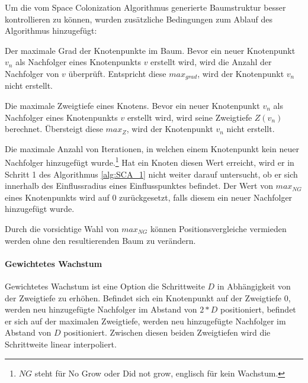 Um die vom Space Colonization Algorithmus generierte Baumstruktur besser kontrollieren zu können, wurden zusätzliche Bedingungen zum Ablauf des Algorithmus hinzugefügt:
\begin{description}[labelindent]
	\item[\boldmath$max_{grad}$] Der maximale Grad der Knotenpunkte im Baum. Bevor ein neuer Knotenpunkt $v_n$ als Nachfolger eines Knotenpunkts $v$ erstellt wird, wird die Anzahl der Nachfolger von $v$ überprüft. Entspricht diese $max_{grad}$, wird der Knotenpunkt $v_n$ nicht erstellt.\\
	
	\item[\boldmath$max_{Z}$] Die maximale Zweigtiefe eines Knotens. Bevor ein neuer Knotenpunkt $v_n$ als Nachfolger eines Knotenpunkts $v$ erstellt wird, wird seine Zweigtiefe $Z(v_n)$ berechnet. Übersteigt diese $max_{Z}$, wird der Knotenpunkt $v_n$ nicht erstellt.\\
	
	\item[\boldmath$max_{NG}$] Die maximale Anzahl von Iterationen, in welchen einem Knotenpunkt kein neuer Nachfolger hinzugefügt wurde.\footnote{$NG$ steht für \glqq No Grow\grqq{} oder \glqq Did not grow\grqq, englisch für \glqq kein Wachstum\grqq.} Hat ein Knoten diesen Wert erreicht, wird er in Schritt 1 des Algorithmus \ref{alg:SCA_1} nicht weiter darauf untersucht, ob er sich innerhalb des Einflussradius eines Einflusspunktes befindet. Der Wert von $max_{NG}$ eines Knotenpunkts wird auf $0$ zurückgesetzt, falls diesem ein neuer Nachfolger hinzugefügt wurde.
	
	Durch die vorsichtige Wahl von $max_{NG}$ können Positionsvergleiche vermieden werden ohne den resultierenden Baum zu verändern.
\end{description}

\paragraph{Gewichtetes Wachstum}

Gewichtetes Wachstum ist eine Option die Schrittweite $D$ in Abhängigkeit von der Zweigtiefe zu erhöhen. Befindet sich ein Knotenpunkt auf der Zweigtiefe $0$, werden neu hinzugefügte Nachfolger im Abstand von $2 * D$ positioniert, befindet er sich auf der maximalen Zweigtiefe, werden neu hinzugefügte Nachfolger im Abstand von $D$ positioniert. Zwischen diesen beiden Zweigtiefen wird die Schrittweite linear interpoliert.

